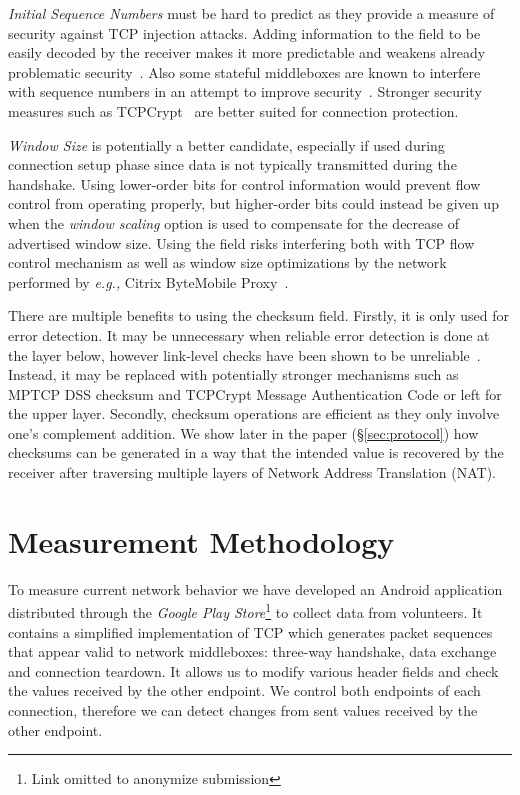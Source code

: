 \documentclass{sig-alternate-10pt}
\providecommand{\eg}{\emph{e.g.,} }
\begin{document}
\emph{Initial Sequence Numbers} must be hard to predict as they provide a measure of security against TCP injection attacks. Adding information to the field to be easily decoded by the receiver makes it more predictable and weakens already problematic security~\cite{Bellovin:uz,Qian:2012wb}. Also some stateful middleboxes are known to interfere with sequence numbers in an attempt to improve security~\cite{Qian:2012bj}. Stronger security measures such as TCPCrypt~\cite{Mazieres:uz} are better suited for connection protection.

\emph{Window Size} is potentially a better candidate, especially if used during connection setup phase since data is not typically transmitted during the handshake. Using lower-order bits for control information would prevent flow control from operating properly, but higher-order bits could instead be given up when the \emph{window scaling} option is used to compensate for the decrease of advertised window size. Using the field risks interfering both with TCP flow control mechanism as well as window size optimizations by the network~\cite{Kopparty:2002ht,Chakravorty:2003dm} performed by \eg Citrix ByteMobile Proxy~\cite{Ha:2006td}. 

There are multiple benefits to using the checksum field. Firstly, it is only used for error detection. It may be unnecessary when reliable error detection is done at the layer below, however link-level checks have been shown to be unreliable~\cite{Stone:2000fc}. Instead, it may be replaced with potentially stronger mechanisms such as MPTCP DSS checksum and TCPCrypt Message Authentication Code or left for the upper layer. Secondly, checksum operations are efficient as they only involve one's complement addition. We show later in the paper (\S\ref{sec:protocol}) how checksums can be generated in a way that the intended value is recovered by the receiver after traversing multiple layers of Network Address Translation (NAT).

\section{Measurement Methodology}

To measure current network behavior we have developed an Android application distributed through the \emph{Google Play Store}\footnote{Link omitted to anonymize submission} to collect data from volunteers. It contains a simplified implementation of TCP which generates packet sequences that appear valid to network middleboxes: three-way handshake, data exchange and connection teardown. It allows us to modify various header fields and check the values received by the other endpoint. We control both endpoints of each connection, therefore we can detect changes from sent values received by the other endpoint.
\end{document}

